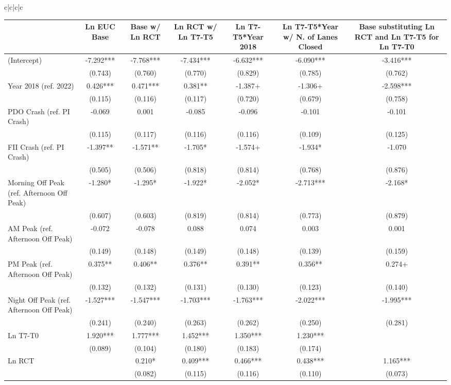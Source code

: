 \documentclass[
  letterpaper,
  authoryear]{elsarticle}
\begin{document}
\begin{table}
{\begin{tabular}[t]{c|c|c|c}
\begin{table}
\begin{table}
{\centering
\begin{tabular}[t]{lcccccc}
\toprule
  & Ln EUC Base & Base w/ Ln RCT & Ln RCT w/ Ln T7-T5 & Ln T7-T5*Year 2018 & Ln T7-T5*Year w/ N. of Lanes Closed & Base substituting Ln RCT and Ln T7-T5 for Ln T7-T0\\
\midrule
(Intercept) & -7.292*** & -7.768*** & -7.434*** & -6.632*** & -6.090*** & -3.416***\\
 & (0.743) & (0.760) & (0.770) & (0.829) & (0.785) & (0.762)\\
Year 2018 (ref. 2022) & 0.426*** & 0.471*** & 0.381** & -1.387+ & -1.306+ & -2.598***\\
 & (0.115) & (0.116) & (0.117) & (0.720) & (0.679) & (0.758)\\
PDO Crash (ref. PI Crash) & -0.069 & 0.001 & -0.085 & -0.096 & -0.101 & -0.101\\
 & (0.115) & (0.117) & (0.116) & (0.116) & (0.109) & (0.125)\\
FII Crash (ref. PI Crash) & -1.397** & -1.571** & -1.705* & -1.574+ & -1.934* & -1.070\\
 & (0.505) & (0.506) & (0.818) & (0.814) & (0.768) & (0.876)\\
Morning Off Peak (ref. Afternoon Off Peak) & -1.280* & -1.295* & -1.922* & -2.052* & -2.713*** & -2.168*\\
 & (0.607) & (0.603) & (0.819) & (0.814) & (0.773) & (0.879)\\
AM Peak (ref. Afternoon Off Peak) & -0.072 & -0.078 & 0.088 & 0.074 & 0.003 & 0.001\\
 & (0.149) & (0.148) & (0.149) & (0.148) & (0.139) & (0.159)\\
PM Peak (ref. Afternoon Off Peak) & 0.375** & 0.406** & 0.376** & 0.391** & 0.356** & 0.274+\\
 & (0.132) & (0.132) & (0.131) & (0.130) & (0.123) & (0.140)\\
Night Off Peak (ref. Afternoon Off Peak) & -1.527*** & -1.547*** & -1.703*** & -1.763*** & -2.022*** & -1.995***\\
 & (0.241) & (0.240) & (0.263) & (0.262) & (0.250) & (0.281)\\
Ln T7-T0 & 1.920*** & 1.777*** & 1.452*** & 1.350*** & 1.230*** & \\
 & (0.089) & (0.104) & (0.180) & (0.183) & (0.174) & \\
Ln RCT &  & 0.210* & 0.409*** & 0.466*** & 0.438*** & 1.165***\\
 &  & (0.082) & (0.115) & (0.116) & (0.110) & (0.073)\\

\end{tabular}}
\end{table}
\end{table}
\end{tabular}}
\end{table}
\end{document}
